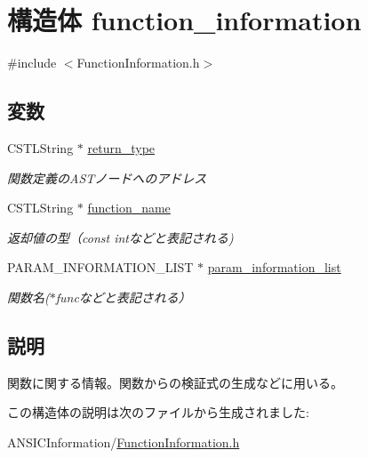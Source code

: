 \hypertarget{structfunction__information}{
\section{構造体 function\_\-information}
\label{structfunction__information}
}


{\ttfamily \#include $<$FunctionInformation.h$>$}

\subsection*{変数}
\begin{DoxyCompactItemize}
\item 
\hypertarget{structfunction__information_a2b02003e288d807bc956d740d56e7e0b}{
CSTLString $\ast$ \hyperlink{structfunction__information_a2b02003e288d807bc956d740d56e7e0b}{return\_\-type}}
\label{structfunction__information_a2b02003e288d807bc956d740d56e7e0b}

\begin{DoxyCompactList}\small\item\em 関数定義のASTノードへのアドレス \item\end{DoxyCompactList}\item 
\hypertarget{structfunction__information_aa138620bc112025eb61bda9efa4e2f24}{
CSTLString $\ast$ \hyperlink{structfunction__information_aa138620bc112025eb61bda9efa4e2f24}{function\_\-name}}
\label{structfunction__information_aa138620bc112025eb61bda9efa4e2f24}

\begin{DoxyCompactList}\small\item\em 返却値の型（const intなどと表記される) \item\end{DoxyCompactList}\item 
\hypertarget{structfunction__information_a494d2b5b09c191eda0f90b9bf8adc952}{
PARAM\_\-INFORMATION\_\-LIST $\ast$ \hyperlink{structfunction__information_a494d2b5b09c191eda0f90b9bf8adc952}{param\_\-information\_\-list}}
\label{structfunction__information_a494d2b5b09c191eda0f90b9bf8adc952}

\begin{DoxyCompactList}\small\item\em 関数名($\ast$funcなどと表記される） \item\end{DoxyCompactList}\end{DoxyCompactItemize}


\subsection{説明}
関数に関する情報。関数からの検証式の生成などに用いる。 

この構造体の説明は次のファイルから生成されました:\begin{DoxyCompactItemize}
\item 
ANSICInformation/\hyperlink{FunctionInformation_8h}{FunctionInformation.h}\end{DoxyCompactItemize}
